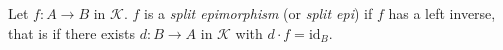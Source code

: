Let $f: A \longrightarrow B$ in $\mathcal{K}$. $f$ is a \textit{split epimorphism} (or \textit{split epi}) if $f$ has a left inverse, that is if there exists $d: B \longrightarrow A$ in $\mathcal{K}$ with $d \cdot f = \mathrm{id}_B$.
